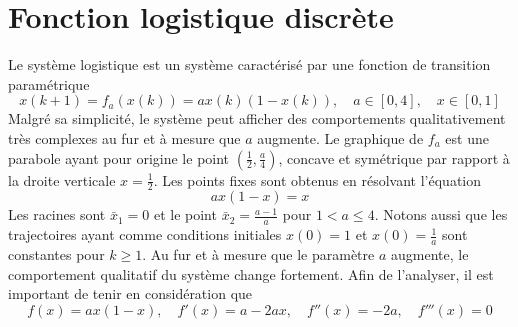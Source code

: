     \section{Fonction logistique discrète}
        Le système logistique est un système caractérisé par une fonction de transition paramétrique
        \begin{equation}
            x(k + 1) = f_a(x(k)) = a x(k)(1 - x(k)), \quad a \in [0, 4], \quad x \in [0, 1]
        \end{equation}
        Malgré sa simplicité, le système peut afficher des comportements qualitativement très complexes au fur et à mesure que $a$ augmente.
        Le graphique de $f_a$ est une parabole ayant pour origine le point $\left(\frac{1}{2}, \frac{a}{4}\right)$, concave et symétrique par rapport à la droite verticale $x = \frac{1}{2}$.
        Les points fixes sont obtenus en résolvant l’équation
        \begin{equation}
            a x (1 - x) = x
        \end{equation}
        Les racines sont $ \bar{x}_1 = 0 $ et le point $\bar{x}_2 = \frac{a - 1}{a}$ pour $1 < a \leq 4$.
        Notons aussi que les trajectoires ayant comme conditions initiales $x(0) = 1$  et $x(0) = \frac{1}{a}$ sont constantes pour $k \geq 1$.
        Au fur et à mesure que le paramètre $a$ augmente, le comportement qualitatif du système change fortement.
        Afin de l’analyser, il est important de tenir en considération que
        \begin{equation}
            f(x) = a x (1 - x), \quad f'(x) = a - 2 a x, \quad f''(x) = -2 a, \quad f'''(x) = 0
        \end{equation}

